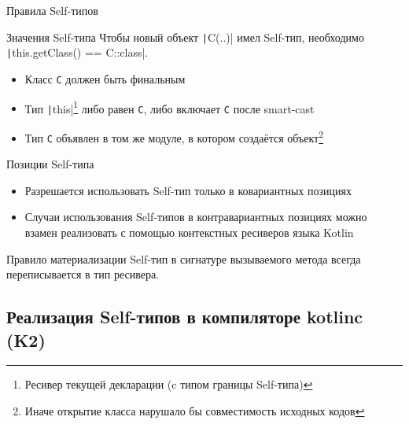 \documentclass[handout,aspectratio=169,usenames,dvipsnames]{beamer}
\begin{document}
    \begin{frame}[fragile]{Правила Self-типов}

        \begin{block}{Значения Self-типа}
            Чтобы новый объект \texttt|C(..)| имел Self-тип, необходимо \texttt|this.getClass() == C::class|.
            \begin{itemize}
                \item Класс \texttt{C} должен быть финальным
                \item Тип \texttt|this|\footnote{Ресивер текущей декларации (c типом границы Self-типа)} либо равен \texttt{С}, либо включает \texttt{C} после smart-cast
                \item Тип \texttt{C} объявлен в том же модуле, в котором создаётся объект\footnote{Иначе открытие класса нарушало бы совместимость исходных кодов}
            \end{itemize}
        \end{block}

        \pause

        \begin{block}{Позиции Self-типа}
            \begin{itemize}
                \item Разрешается использовать Self-тип только в ковариантных позициях
                \item Случаи использования Self-типов в контравариантных позициях можно взамен реализовать с помощью контекстных ресиверов языка Kotlin
            \end{itemize}
        \end{block}

        \pause

        \begin{block}{Правило материализации}
            Self-тип в сигнатуре вызываемого метода всегда переписывается в тип ресивера.
        \end{block}
    \end{frame}


    \subsection{Реализация Self-типов в компиляторе kotlinc (K2)}
\end{document}
